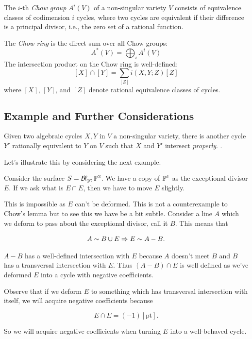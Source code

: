 \documentclass[12pt]{memoir}
\begin{document}
\begin{Def}
    The \( i \)-th \emph{Chow group} \( A^i(V) \) of a non-singular variety \( V \) consists of equivalence classes of codimension \( i \) cycles, where two cycles are equivalent if their difference is a principal divisor, i.e., the zero set of a rational function.
\end{Def}

The \emph{Chow ring} is the direct sum over all Chow groups:
\[A^\ast(V) = \bigoplus_i A^i(V)\]
The intersection product on the Chow ring is well-defined:
\[[X] \cap [Y] = \sum_{[Z]} i(X, Y; Z) [Z]\]
where \( [X] \), \( [Y] \), and \( [Z] \) denote rational equivalence classes of cycles.

\subsection{Example and Further Considerations}

\begin{Lem}
    Given two algebraic cycles \(X,Y\) in \(V\) a non-singular variety, there is another cycle \(Y'\) rationally equivalent to \(Y\) on \(V\) such that \(X\) and \(Y'\) intersect \emph{properly}. .
\end{Lem}

Let's illustrate this by considering the next example.

\begin{Ex}
    Consider the surface \(S=\operatorname{\mathcal{B}\!\ell}_{\text{pt}}\mathbb{P}^2\). We have a copy of \(\mathbb{P}^1\) as the exceptional divisor \(E\). If we ask what is \(E\cap E\), then we have to move \(E\) slightly.\par
    This is impossible as \(E\) can't be deformed. This is not a counterexample to Chow's lemma but to see this we have be a bit subtle. Consider a line \(A\) which we deform to pass about the exceptional divisor, call it \(B\). This means that

    \[A\sim B\cup E\Rightarrow E\sim A-B.\]

    \(A-B\) has a well-defined intersection with \(E\) because \(A\) doesn't meet \(B\) and \(B\) has a transversal intersection with \(E\). Thus \((A-B)\cap E\) is well defined as we've deformed \(E\) into a cycle with negative coefficients.\par
    Observe that if we deform \(E\) to something which has transversal intersection with itself, we will acquire negative coefficients because

    \[E\cap E=(-1)[\text{pt}].\]

    So we will acquire negative coefficients when turning \(E\) into a well-behaved cycle.
\end{Ex}
\end{document}
